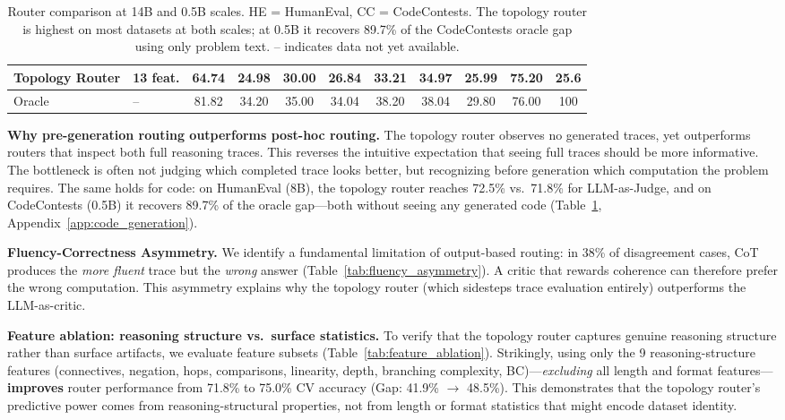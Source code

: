 \documentclass[11pt]{article}
\begin{document}
{\begin{table}[ht]
{\begin{tabular}{llccccccccc}
\textbf{Topology Router} & \textbf{13 feat.} & \textbf{64.74} & 24.98 & 30.00 & \textbf{26.84} & \textbf{33.21} & \textbf{34.97} & 25.99 & \textbf{75.20} & \textbf{25.6} \\
\midrule
Oracle & -- & 81.82 & 34.20 & 35.00 & 34.04 & 38.20 & 38.04 & 29.80 & 76.00 & 100 \\
\bottomrule
\end{tabular}}
\caption{Router comparison at 14B and 0.5B scales. HE = HumanEval, CC = CodeContests. The topology router is highest on most datasets at both scales; at 0.5B it recovers 89.7\% of the CodeContests oracle gap using only problem text. -- indicates data not yet available.}
\label{tab:router_14b_05b}
\end{table}


\textbf{Why pre-generation routing outperforms post-hoc routing.}
The topology router observes no generated traces, yet outperforms routers that inspect both full reasoning traces. This reverses the intuitive expectation that seeing full traces should be more informative. The bottleneck is often not judging which completed trace looks better, but recognizing before generation which computation the problem requires. The same holds for code: on HumanEval (8B), the topology router reaches 72.5\% vs.\ 71.8\% for LLM-as-Judge, and on CodeContests (0.5B) it recovers 89.7\% of the oracle gap---both without seeing any generated code (Table~\ref{tab:router_14b_05b}, Appendix~\ref{app:code_generation}).

\textbf{Fluency-Correctness Asymmetry.}
We identify a fundamental limitation of output-based routing: in 38\% of disagreement cases, CoT produces the \emph{more fluent} trace but the \emph{wrong} answer (Table~\ref{tab:fluency_asymmetry}). A critic that rewards coherence can therefore prefer the wrong computation. This asymmetry explains why the topology router (which sidesteps trace evaluation entirely) outperforms the LLM-as-critic.

\textbf{Feature ablation: reasoning structure vs.\ surface statistics.}
To verify that the topology router captures genuine reasoning structure rather than surface artifacts, we evaluate feature subsets (Table~\ref{tab:feature_ablation}). Strikingly, using only the 9 reasoning-structure features (connectives, negation, hops, comparisons, linearity, depth, branching complexity, BC)---\emph{excluding} all length and format features---\textbf{improves} router performance from 71.8\% to 75.0\% CV accuracy (Gap: 41.9\% $\to$ 48.5\%). This demonstrates that the topology router's predictive power comes from reasoning-structural properties, not from length or format statistics that might encode dataset identity.

}
\end{document}
